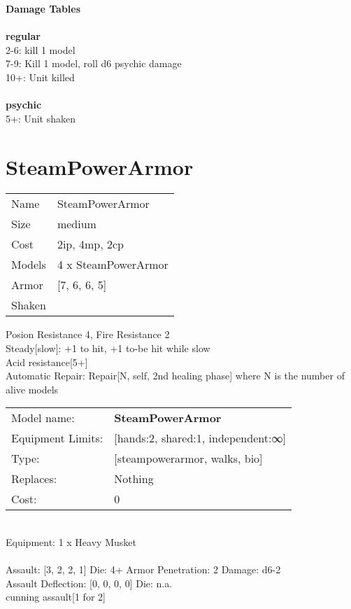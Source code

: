 {\bf Damage Tables} \\
\ \\ {\bf regular } \\
2-6: kill 1 model \\
7-9: Kill 1 model, roll d6 psychic damage \\
10+: Unit killed \\
\ \\ {\bf psychic } \\
5+: Unit shaken \\










\pagebreak\pagebreak

\section{ SteamPowerArmor }

\begin{tabular}{ll}
  Name & SteamPowerArmor \\
  Size & medium\\
  Cost & 2ip, 4mp, 2cp\\
  Models & 4 x SteamPowerArmor\\
  Armor & [7, 6, 6, 5]\\
  Shaken & \\
\end{tabular}

\noindent Posion Resistance 4, Fire Resistance 2\\ 
Steady[slow]: +1 to hit, +1 to-be hit while slow\\ 
Acid resistance[5+]\\ 
Automatic Repair: Repair[N, self, 2nd healing phase] where N is the number of alive models\\ 


\noindent
\begin{tabular}{ll}
Model name: &{\bf SteamPowerArmor } \\
Equipment Limits: &[hands:2, shared:1, independent:∞] \\
Type: &[steampowerarmor, walks, bio] \\
Replaces: &Nothing \\
Cost: & 0\\
\end{tabular}
\ \\
Equipment: 1 x Heavy Musket \\
\ \\
Assault: [3, 2, 2, 1] Die: 4+ Armor Penetration: 2 Damage: d6-2 \\
Assault Deflection: [0, 0, 0, 0] Die: n.a.\\
\indent cunning assault[1 for 2]\\ 
 
